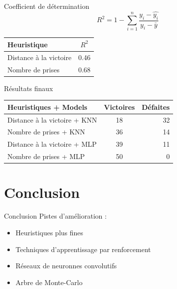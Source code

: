\documentclass{beamer}
\begin{document}
\begin{frame}{Coefficient de détermination}
    $$R^2 = 1 - \sum_{i=1}^{n} \frac{y_i - \hat{y_i}}{y_i - \bar{y}}$$
    \begin{center}
        \begin{tabular}{ | l | c | }
            \hline
            Heuristique & $R^2$ \\ \hline
            Distance à la victoire & 0.46 \\ \hline
            Nombre de prises & 0.68 \\ \hline
        \end{tabular}
    \end{center}
\end{frame}

\begin{frame}{Résultats finaux}
    \begin{center}
        \begin{tabular}{ | l || c | r |}
            \hline 
            Heuristiques + Models & Victoires & Défaites \\
            \hline 
            \hline 
            Distance à la victoire + KNN & 18 & 32 \\
            Nombre de prises + KNN & 36 & 14 \\
            Distance à la victoire + MLP & 39 & 11 \\
            Nombre de prises + MLP & 50 & 0 \\ \hline
        \end{tabular}

    \end{center}
\end{frame}


{\section*{Conclusion}}

\begin{frame}{Conclusion}
    Pistes d'amélioration : 
    \begin{itemize}
        \item Heuristiques plus fines
        \item Techniques d'apprentissage par renforcement
        \item Réseaux de neuronnes convolutifs
        \item Arbre de Monte-Carlo
    \end{itemize}
\end{frame}
\end{document}

